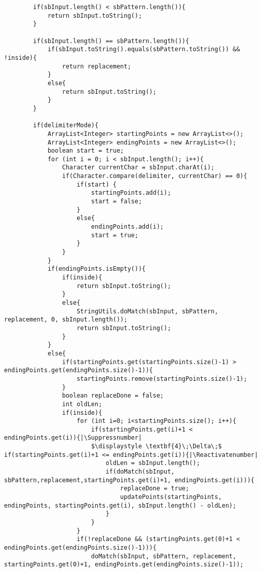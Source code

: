 \documentclass{article}
\makeatletter
\let\origthelstnumber\thelstnumber
\newcommand*\Suppressnumber{%
  \lst@AddToHook{OnNewLine}{%
    \let\thelstnumber\relax%
     \advance\c@lstnumber-\@ne\relax%
    }%
}
\newcommand*\Reactivatenumber{%
  \lst@AddToHook{OnNewLine}{%
   \let\thelstnumber\origthelstnumber%
   \advance\c@lstnumber\@ne\relax}%
}
\makeatother
\begin{document}
\begin{lstlisting}
        if(sbInput.length() < sbPattern.length()){
            return sbInput.toString();
        }

        if(sbInput.length() == sbPattern.length()){
            if(sbInput.toString().equals(sbPattern.toString()) && !inside){
                return replacement;
            }
            else{
                return sbInput.toString();
            }
        }

        if(delimiterMode){
            ArrayList<Integer> startingPoints = new ArrayList<>();
            ArrayList<Integer> endingPoints = new ArrayList<>();
            boolean start = true;
            for (int i = 0; i < sbInput.length(); i++){
                Character currentChar = sbInput.charAt(i);
                if(Character.compare(delimiter, currentChar) == 0){
                    if(start) {
                        startingPoints.add(i);
                        start = false;
                    }
                    else{
                        endingPoints.add(i);
                        start = true;
                    }
                }
            }
            if(endingPoints.isEmpty()){
                if(inside){
                    return sbInput.toString();
                }
                else{
                    StringUtils.doMatch(sbInput, sbPattern, replacement, 0, sbInput.length());
                    return sbInput.toString();
                }
            }
            else{
                if(startingPoints.get(startingPoints.size()-1) > endingPoints.get(endingPoints.size()-1)){
                    startingPoints.remove(startingPoints.size()-1);
                }
                boolean replaceDone = false;
                int oldLen;
                if(inside){
                    for (int i=0; i<startingPoints.size(); i++){
                        if(startingPoints.get(i)+1 < endingPoints.get(i)){|\Suppressnumber|
                        $\displaystyle \textbf{4}\;\Delta\;$ if(startingPoints.get(i)+1 <= endingPoints.get(i)){|\Reactivatenumber|
                            oldLen = sbInput.length();
                            if(doMatch(sbInput, sbPattern,replacement,startingPoints.get(i)+1, endingPoints.get(i))){
                                replaceDone = true;
                                updatePoints(startingPoints, endingPoints, startingPoints.get(i), sbInput.length() - oldLen);
                            }
                        }
                    }
                    if(!replaceDone && (startingPoints.get(0)+1 < endingPoints.get(endingPoints.size()-1))){
                        doMatch(sbInput, sbPattern, replacement, startingPoints.get(0)+1, endingPoints.get(endingPoints.size()-1));

\end{lstlisting}
\end{document}
